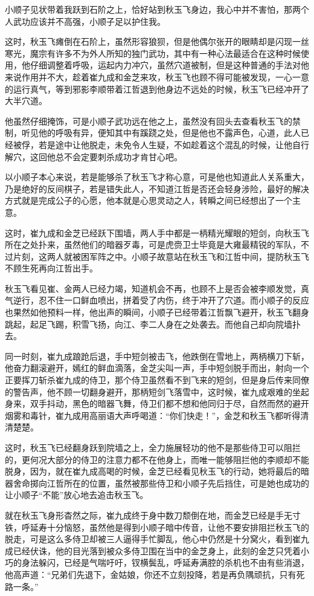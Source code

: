 小顺子见状带着我跃到石阶之上，恰好站到秋玉飞身边，我心中并不害怕，那两个人武功应该并不高强，小顺子足以护住我。

这时，秋玉飞瘫倒在石阶上，虽然形容狼狈，但是他偶尔张开的眼睛却是闪现一丝寒光，魔宗有许多不为外人所知的独门武功，其中有一种心法最适合在这种时候使用，他仔细调整着呼吸，运起内力冲穴，虽然穴道被制，但是这种普通的手法对他来说作用并不大，趁着崔九成和金芝来攻，秋玉飞也顾不得可能被发现，一心一意的运行真气，等到邪影李顺带着江哲退到他身边不远处的时候，秋玉飞已经冲开了大半穴道。

他虽然仔细掩饰，可是小顺子武功远在他之上，虽然没有回头去查看秋玉飞的禁制，听见他的呼吸有异，便知其中有蹊跷之处，但是他也不露声色，心道，此人已经被俘，若是途中让他脱走，未免令人生疑，不如趁着这个混乱的时候，让他自行解穴，这回他总不会定要刺杀成功才肯甘心吧。

以小顺子本心来说，若是能够杀了秋玉飞才称心意，可是他也知道此人关系重大，乃是绝好的反间棋子，若是错失此人，不知道江哲是否还会轻身涉险，最好的解决方式就是完成公子的心愿，他本就是心思灵动之人，转瞬之间已经想出了一个主意。

这时，崔九成和金芝已经跃下围墙，两人手中都是一柄精光耀眼的短剑，向秋玉飞所在之处扑来，虽然他们的暗器歹毒，可是虎赍卫士毕竟是大雍最精锐的军队，不过片刻，这两人就被困军阵之中。小顺子故意站在秋玉飞和江哲中间，提防秋玉飞不顾生死再向江哲出手。

秋玉飞看见崔、金两人已经力竭，知道机会不再，也顾不上是否会被李顺发觉，真气逆行，忍不住一口鲜血喷出，拼着受了内伤，终于冲开了穴道。而小顺子的反应也果然如他预料一样，他出声的瞬间，小顺子已经带着江哲飘飞避开，秋玉飞翻身跳起，起足飞踢，积雪飞扬，向江、李二人身在之处袭去。而他自己却向院墙扑去。

同一时刻，崔九成踉跄后退，手中短剑被击飞，他跌倒在雪地上，两柄横刀下斩，他奋力翻滚避开，嫣红的鲜血滴落，金芝尖叫一声，手中短剑脱手而出，射向一个正要挥刀斩杀崔九成的侍卫，那个侍卫虽然看不到飞来的短剑，但是身后传来同僚的警告声，他不顾一切翻身避开，那柄短剑飞落雪中，这时候，崔九成艰难的坐起身来，双手抖动，黑色的暗器飞舞，侍卫们都不想和他同归于尽，自然而然的避开烟雾和毒针，崔九成用高丽语大声呼喝道：“你们快走！”，金芝和秋玉飞都听得清清楚楚。

这时，秋玉飞已经翻身跃到院墙之上，全力施展轻功的他不是那些侍卫可以阻拦的，更何况大部分的侍卫的注意力都不在他身上，而唯一能够阻拦他的李顺却不能脱身，因为，就在崔九成高喝的时候，金芝已经看见秋玉飞的行动，她将最后的暗器舍命掷向江哲所在的位置，虽然被那些侍卫和小顺子先后挡住，可是她也成功的让小顺子“不能”放心地去追击秋玉飞。

就在秋玉飞身形杳然之际，崔九成终于身中数刀颓倒在地，而金芝已经是手无寸铁，呼延寿十分恼怒，虽然他是得到小顺子暗中传音，让他不要安排阻拦秋玉飞的脱走，可是这么多侍卫却被三人逼得手忙脚乱，他心中仍然是十分窝火，看到崔九成已经伏诛，他的目光落到被众多侍卫围在当中的金芝身上，此刻的金芝只凭着小巧的身法躲闪，已经是气喘吁吁，钗横鬓乱，呼延寿满腔的杀机也不由有些消退，他高声道：“兄弟们先退下，金姑娘，你还不立刻投降，若是再负隅顽抗，只有死路一条。”


